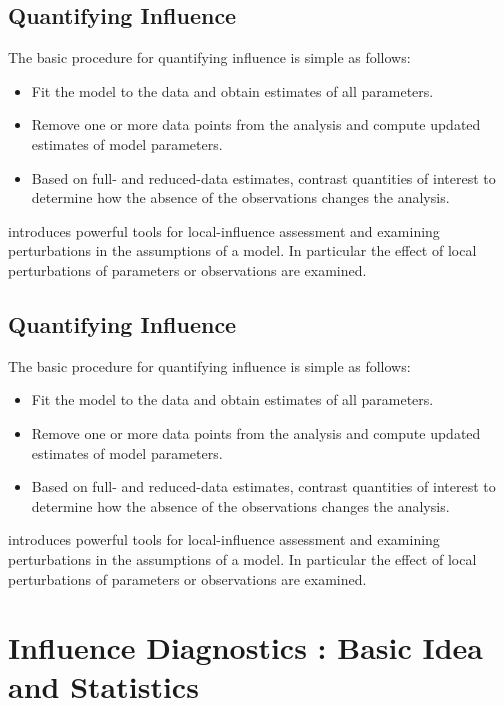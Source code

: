 \documentclass[12pt, a4paper]{article}
\begin{document}
\subsection{Quantifying Influence}  %

The basic procedure for quantifying influence is simple as follows:

\begin{itemize}
	\item Fit the model to the data and obtain estimates of all parameters.
	\item Remove one or more data points from the analysis and compute updated estimates of model parameters.
	\item Based on full- and reduced-data estimates, contrast quantities of interest to determine how the absence of the observations changes the analysis.
\end{itemize}

\citet{cook86} introduces powerful tools for local-influence assessment and examining perturbations in the assumptions of a model. In particular the effect of local perturbations of parameters or observations are examined.


\subsection{Quantifying Influence}  %

The basic procedure for quantifying influence is simple as follows:

\begin{itemize}
	\item Fit the model to the data and obtain estimates of all parameters.
	\item Remove one or more data points from the analysis and compute updated estimates of model parameters.
	\item Based on full- and reduced-data estimates, contrast quantities of interest to determine how the absence of the observations changes the analysis.
\end{itemize}

\citet{cook86} introduces powerful tools for local-influence assessment and examining perturbations in the assumptions of a model. In particular the effect of local perturbations of parameters or observations are examined.

\newpage


\section*{Influence Diagnostics : Basic Idea and Statistics}
\end{document}
